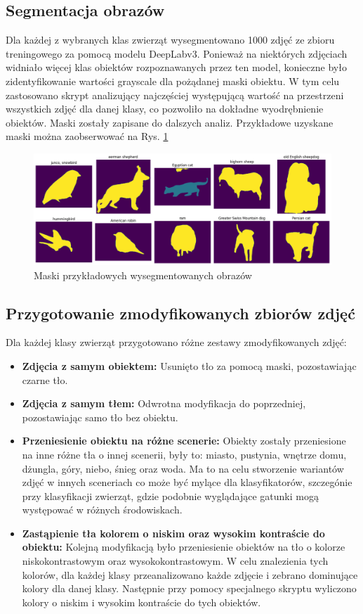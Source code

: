 \subsection*{Segmentacja obrazów}

Dla każdej z wybranych klas zwierząt wysegmentowano 1000 zdjęć ze zbioru treningowego za pomocą modelu DeepLabv3. Ponieważ na niektórych zdjęciach widniało więcej klas obiektów rozpoznawanych przez ten model, konieczne było zidentyfikowanie 
wartości grayscale dla pożądanej maski obiektu. W tym celu zastosowano skrypt analizujący najczęściej występującą wartość na przestrzeni wszystkich zdjęć dla danej klasy, co pozwoliło na dokładne wyodrębnienie obiektów. Maski zostały zapisane 
do dalszych analiz. Przykładowe uzyskane maski można zaobserwować na Rys. \ref{rys:masks}

\begin{figure}
	\centering\includegraphics[width=.9\textwidth]{img/masks}
	\caption{Maski przykładowych wysegmentowanych obrazów}  \label{rys:masks}
\end{figure}

\subsection*{Przygotowanie zmodyfikowanych zbiorów zdjęć}

Dla każdej klasy zwierząt przygotowano różne zestawy zmodyfikowanych zdjęć:
\begin{itemize}
    \item \textbf{Zdjęcia z samym obiektem:} Usunięto tło za pomocą maski, pozostawiając czarne tło.
    \item \textbf{Zdjęcia z samym tłem:} Odwrotna modyfikacja do poprzedniej, pozostawiając samo tło bez obiektu. 
    \item \textbf{Przeniesienie obiektu na różne scenerie:} Obiekty zostały przeniesione na inne różne tła o innej scenerii, były to: miasto, pustynia, wnętrze domu, dżungla, góry, niebo, śnieg oraz woda. Ma to na celu stworzenie wariantów 
    zdjęć w innych sceneriach co może być mylące dla klasyfikatorów, szczegónie przy klasyfikacji zwierząt, gdzie podobnie wyglądające gatunki mogą występować w różnych środowiskach. 
    \item \textbf{Zastąpienie tła kolorem o niskim oraz wysokim kontraście do obiektu:} Kolejną modyfikacją było przeniesienie obiektów na tło o kolorze niskokontrastowym oraz wysokokontrastowym. W celu znalezienia tych kolorów, dla każdej klasy 
    przeanalizowano każde zdjęcie i zebrano dominujące kolory dla danej klasy. Następnie przy pomocy specjalnego skryptu wyliczono kolory o niskim i wysokim kontraście do tych obiektów. 
\end{itemize}

